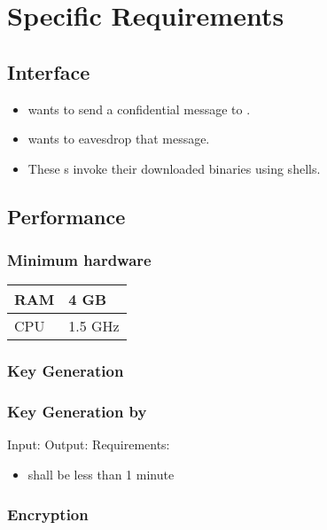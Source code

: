 \section{Specific Requirements}


\subsection{Interface}

\begin{frame}
\begin{itemize}
\item \alice{} wants to send a confidential message to \bob.
\item \eve{} wants to eavesdrop that message.
\item These \eu s invoke their downloaded \cry{} binaries
  using \cl{} shells.
\end{itemize}
\end{frame}


\subsection{Performance}

\begin{frame}
\frametitle{Minimum hardware}
\begin{tabular}{l|l}
RAM & 4 GB \\ \hline
CPU & 1.5 GHz
\end{tabular}
\end{frame}

\subsubsection{Key Generation}

\begin{frame}
\frametitle{Key Generation by \bob}
Input: \generatekeysin \medskip
Output: \generatekeysout \medskip
Requirements:
\begin{itemize}
\item \generatekeystime{}
  shall be less than 1 minute
\end{itemize}
\end{frame}

\subsubsection{Encryption}

